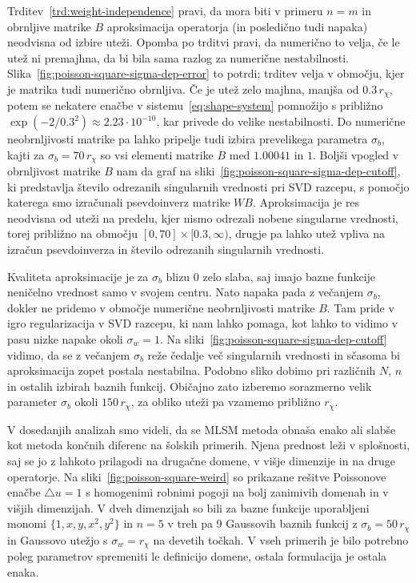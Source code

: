 \documentclass[12pt,a4paper,twoside]{article}
\theoremstyle{definition} %
\theoremstyle{plain} %
\numberwithin{equation}{section}
\newcommand{\lap}{\triangle}
\begin{document}
Trditev~\ref{trd:weight-independence} pravi, da mora biti v primeru $n=m$ in obrnljive matrike $B$
aproksimacija operatorja (in posledično tudi napaka) neodvisna od izbire uteži. Opomba po trditvi
pravi, da numerično to velja, če le utež ni premajhna, da bi bila sama razlog za numerične
nestabilnosti. Slika~\ref{fig:poisson-square-sigma-dep-error} to potrdi; trditev velja v območju,
kjer je matrika tudi numerično obrnljiva. Če je utež zelo majhna, manjša od $0.3\,r_\chi$, potem se
nekatere enačbe v sistemu~\eqref{eq:shape-system} pomnožijo s približno $\exp(-2/0.3^2) \approx
2.23\cdot10^{-10}$, kar privede do velike nestabilnosti. Do numerične neobrnljivosti matrike pa
lahko pripelje tudi izbira prevelikega parametra $\sigma_b$, kajti za $\sigma_b = 70\,r_\chi$ so vsi
elementi matrike $B$ med $1.00041$ in $1$. Boljši vpogled v obrnljivost matrike $B$ nam da graf na
sliki~\ref{fig:poisson-square-sigma-dep-cutoff}, ki predstavlja število odrezanih singularnih
vrednosti pri SVD razcepu, s pomočjo katerega smo izračunali psevdoinverz matrike $WB$.
Aproksimacija je res neodvisna od uteži na predelu, kjer nismo odrezali nobene singularne vrednosti,
torej približno na območju $[0, 70] \times [0.3, \infty)$, drugje pa lahko utež vpliva na izračun
psevdoinverza in število odrezanih singularnih vrednosti.

Kvaliteta aproksimacije je za $\sigma_b$ blizu 0 zelo slaba, saj imajo bazne funkcije neničelno
vrednost samo v svojem centru. Nato napaka pada z večanjem $\sigma_b$, dokler ne pridemo v območje
numerične neobrnljivosti matrike $B$. Tam pride v igro regularizacija v SVD razcepu, ki nam lahko
pomaga, kot lahko to vidimo v pasu nizke napake okoli $\sigma_w = 1$. Na
sliki~\ref{fig:poisson-square-sigma-dep-cutoff} vidimo, da se z večanjem $\sigma_b$ reže čedalje več
singularnih vrednosti in sčasoma bi aproksimacija zopet postala nestabilna. Podobno sliko dobimo
pri različnih $N$, $n$ in ostalih izbirah baznih funkcij. Običajno zato izberemo sorazmerno velik
parameter $\sigma_b$ okoli $150\,r_\chi$, za obliko uteži pa vzamemo približno $r_\chi$.

V dosedanjih analizah smo videli, da se MLSM metoda obnaša enako ali slabše kot metoda končnih
diferenc na šolskih primerih. Njena prednost leži v splošnosti, saj se jo z lahkoto prilagodi na
drugačne domene, v višje dimenzije in na druge operatorje. Na sliki~\ref{fig:poisson-square-weird}
so prikazane rešitve Poissonove enačbe $\lap u = 1$ s homogenimi robnimi pogoji na bolj zanimivih
domenah in v višjih dimenzijah. V dveh dimenzijah so bili za bazne funkcije uporabljeni monomi $\{1,
x, y, x^2, y^2\}$ in $n=5$ v treh pa 9 Gaussovih baznih funkcij z $\sigma_b = 50\,r_\chi$ in
Gaussovo utežjo s $\sigma_w = r_\chi$ na devetih točkah. V vseh primerih je bilo potrebno poleg
parametrov spremeniti le definicijo domene, ostala formulacija je ostala enaka.
\end{document}
